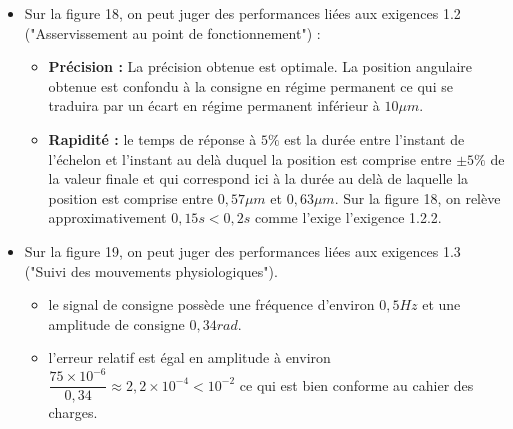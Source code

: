 \documentclass[10pt,fleqn]{article} %
\begin{document}
\begin{itemize}
\item Sur la figure 18, on peut juger des performances liées aux exigences 1.2 ("Asservissement au point de fonctionnement") :
\begin{itemize}
\item \textbf{Précision :} La précision obtenue est optimale. La position angulaire obtenue est confondu à la consigne en régime permanent ce qui se traduira par un écart en régime permanent inférieur à $10\mu m$.
\item \textbf{Rapidité : } le temps de réponse à $5\%$ est la durée entre l'instant de l'échelon et l'instant au delà duquel la position est comprise entre $\pm 5\%$ de la valeur finale et qui correspond ici à la durée au delà de laquelle la position est comprise entre $0,57\mu m$ et $0,63\mu m$. Sur la figure 18, on relève approximativement $0,15s<0,2s$ comme l'exige l'exigence 1.2.2.  
\end{itemize}
\item Sur la figure 19, on peut juger des performances liées aux exigences 1.3 ("Suivi des mouvements physiologiques"). 
\begin{itemize}
\item le signal de consigne possède une fréquence d'environ $0,5Hz$ et une amplitude de consigne $0,34rad$. 
\item l'erreur relatif est égal en amplitude à environ $\dfrac{75\times 10^{-6}}{0,34}\approx 2,2\times 10^{-4}<10^{-2}$ ce qui est bien conforme au cahier des charges.
\end{itemize}
\end{itemize}
\end{document}
